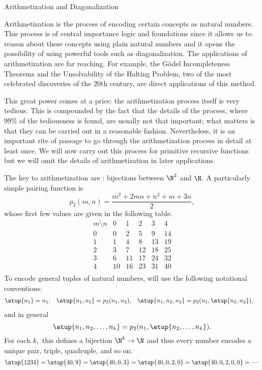 \begin{unit}{Arithmetization and Diagonalization}

Arithmetization is the process of encoding certain concepts as natural numbers.
This process is of central importance logic and foundations since it allows us to reason about these concepts using plain natural numbers and it opens the possibility of using powerful tools such as diagonalization.
The applications of arithmetization are far reaching.
For example, the G\"odel Incompleteness Theorems and the Unsolvability of the Halting Problem, two of the most celebrated discoveries of the 20th century, are direct applications of this method.

This great power comes at a price: the arithmetization process itself is very tedious.
This is compounded by the fact that the details of the process, where 99\% of the tediousness is found, are usually not that important; what matters is that they can be carried out in a reasonable fashion.
Nevertheless, it is an important rite of passage to go through the arithmetization process in detail at least once.
We will now carry out this process for primitive recursive functions but we will omit the details of arithmetization in later applications.

The key to arithmetization are : bijections between \(\N^2\) and \(\N.\)
A particularly simple pairing function is \[p_2(m,n) = \frac{m^2+2mn+n^2+m+3n}{2},\] whose first few values are given in the following table.
\[\begin{array}{c|cccccc}
  m \setminus n & 0 & 1 & 2 & 3 & 4 \\\hline
  0 & 0 & 2 & 5 & 9 & 14 \\
  1 & 1  & 4 & 8 & 13 & 19 \\
  2 & 3 & 7 & 12 & 18 & 25 \\
  3 & 6 & 11 & 17 & 24 & 32 \\
  4 & 10 & 16 & 23 & 31 & 40 \\
\end{array}\]
To encode general tuples of natural numbers, will use the following notational conventions: \[\begin{aligned}
  \atup{n_1} &= n_1, &
  \atup{n_1,n_2} &= p_2(n_1,n_2), &
  \atup{n_1,n_2,n_3} &= p_2(n_1,\atup{n_2,n_3}), 
\end{aligned}\]
and in general \[\atup{n_1,n_2,\dots,n_k}  = p_2(n_1,\atup{n_2,\dots,n_k}).\]
For each \(k,\) this defines a bijection \(\N^k\to\N\) and thus every number encodes a unique pair, triple, quadruple, and so on:
\[\atup{1234} = \atup{40,9} = \atup{40,0,3} = \atup{40,0,2,0} = \atup{40,0,2,0,0} = \cdots\]


\end{unit}
